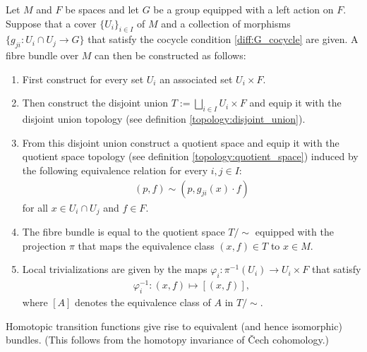     \begin{construct}\label{diff:fibre_bundle_construction_theorem}
        Let $M$ and $F$ be spaces and let $G$ be a group equipped with a left action on $F$. Suppose that a cover $\{U_i\}_{i\in I}$ of $M$ and a collection of morphisms $\{g_{ji}:U_i\cap U_j\rightarrow G\}$ that satisfy the cocycle condition \ref{diff:G_cocycle} are given. A fibre bundle over $M$ can then be constructed as follows:
        \begin{enumerate}
            \item First construct for every set $U_i$ an associated set $U_i\times F$.
            \item Then construct the disjoint union $T:=\bigsqcup_{i\in I}U_i\times F$ and equip it with the disjoint union topology (see definition \ref{topology:disjoint_union}).
            \item From this disjoint union construct a quotient space and equip it with the quotient space topology (see definition \ref{topology:quotient_space}) induced by the following equivalence relation for every $i,j\in I$:
                \begin{gather}
                    (p, f)\sim(p,g_{ji}(x)\cdot f)
                \end{gather}
                for all $x\in U_i\cap U_j$ and $f\in F$.
            \item The fibre bundle is equal to the quotient space $T/\sim$ equipped with the projection $\pi$ that maps the equivalence class $(x,f)\in T$ to $x\in M$.
            \item Local trivializations are given by the maps $\varphi_i:\pi^{-1}(U_i)\rightarrow U_i\times F$ that satisfy
                \begin{gather}
                    \varphi_i^{-1}:(x,f)\mapsto [(x,f)],
                \end{gather}
                where $[A]$ denotes the equivalence class of $A$ in $T/\sim$.
        \end{enumerate}
    \end{construct}
    \begin{property}
        Homotopic transition functions give rise to equivalent (and hence isomorphic) bundles. (This follows from the homotopy invariance of \v{C}ech cohomology.)
    \end{property}


